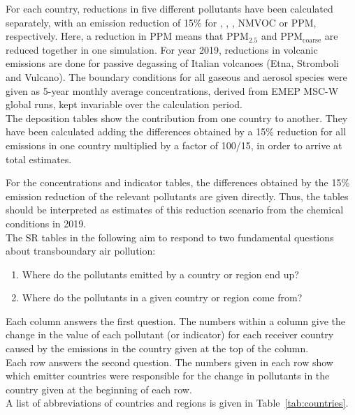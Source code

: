 For each country, reductions in five different pollutants have been
calculated separately, with an emission reduction of 15\% for \sox,
\nox, \nhiii, NMVOC or PPM, respectively. Here, a reduction in PPM
means that PPM$_{2.5}$ and PPM$_\text{coarse}$ are reduced together in one
simulation. 
For year 2019, reductions in volcanic emissions are done 
for passive \soii degassing of Italian volcanoes (Etna, Stromboli and
Vulcano). The boundary conditions for all gaseous and aerosol species were given as 5-year monthly average concentrations, derived from EMEP MSC-W global runs,
kept invariable over the calculation period. \\

The deposition tables show the contribution from one
country to another. They have been calculated adding the differences
obtained by a 15\% reduction for all emissions in one country
multiplied by a factor of 100/15, in order to arrive at total
estimates.

For the concentrations and indicator tables, the differences obtained
by the 15\% emission reduction of the relevant pollutants are given
directly. Thus, the tables should be interpreted as estimates of
this reduction scenario from the chemical conditions in 2019.\\

The SR tables in the following aim to respond to two fundamental
questions about transboundary air pollution:

\begin{enumerate}
\item Where do the pollutants emitted by a country or region end up?
\item Where do the pollutants in a given country or region come from?
\end{enumerate}

Each column answers the first question. The numbers within a column
give the change in the value of each pollutant (or indicator) for each
receiver country caused by
the emissions in the country given at the top of the column.\\

Each row answers the second question. The numbers given in each row show
which emitter countries were responsible for the change in
pollutants in the country given at the beginning of each row.\\

A list of abbreviations of countries and regions is given in Table~\ref{tab:countries}.\\

